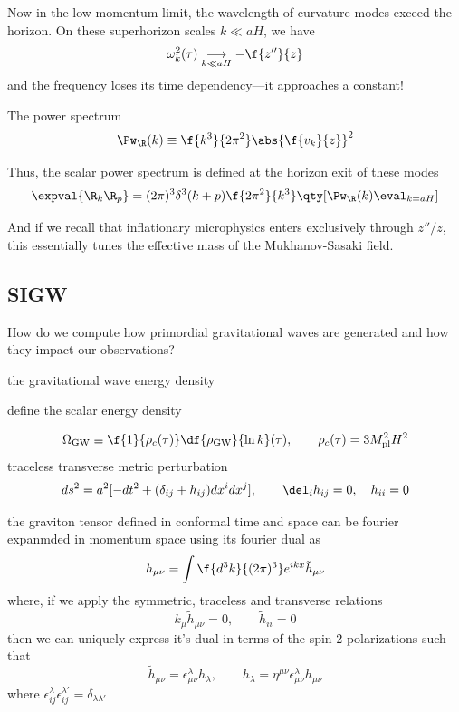 Now in the low momentum limit, the wavelength of curvature modes exceed the horizon. On these superhorizon scales $k\ll aH$, we have 
\[
\omega_k^2(\tau)\underset{k\ll aH}{\longrightarrow} -\f{z''}{z}
\]
and the frequency loses its time dependency—it approaches a constant! 

The power spectrum
\begin{equation}
    \Pw_\R(k)\equiv \f{k^3}{2\pi^2}\abs{\f{v_k}{z}}^2
\end{equation}

Thus, the scalar power spectrum is defined at the horizon exit of these modes
\begin{equation}
    \expval{\R_k\R_p}=(2\pi)^3\delta^3(k+p)\f{2\pi^2}{k^3}\qty[\Pw_\R(k)\eval_{k=aH}]
\end{equation}

And if we recall that inflationary microphysics enters exclusively through $z''/z$, this essentially tunes the effective mass of the Mukhanov-Sasaki field.



\subsection{SIGW}
How do we compute how primordial gravitational waves are generated and how they impact our observations?





the gravitational wave energy density 

define the scalar energy density

\[
\Omega_{\rm GW}\equiv \f{1}{\rho_c(\tau)}\df{\rho_{\rm GW}}{\ln k}(\tau), \qquad \rho_c(\tau)=3M_{\rm pl}^2H^2
\]
traceless transverse metric perturbation
\[
ds^2=a^2[-dt^2+(\delta_{ij}+h_{ij})dx^idx^j], \qquad \del_i h_{ij}=0, \quad h_{ii}=0
\]

the graviton tensor defined in conformal time and space can be fourier expanmded in momentum space using its fourier dual  as
\[
h_{\mu\nu}= \int \f{d^3k}{(2\pi)^3} e^{ikx}\tilde{h}_{\mu\nu}
\]
where, if we apply the symmetric, traceless and transverse relations
\[
k_\mu\tilde{h}_{\mu\nu}=0, \qquad \tilde{h}_{ii}=0
\]
then we can uniquely express it's dual in terms of the spin-2 polarizations such that
\[
\tilde{h}_{\mu\nu}=\epsilon^\lambda_{\mu\nu}h_\lambda, \qquad h_\lambda=\eta^{\mu\nu}\epsilon^\lambda_{\mu\nu}h_{\mu\nu}
\]
where $\epsilon_{ij}^\lambda \epsilon_{ij}^{\lambda'}=\delta_{\lambda\lambda'}$



